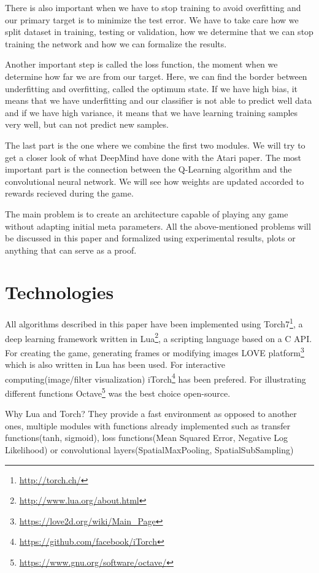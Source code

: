 There is also important when we have to stop training to avoid overfitting and our primary target is to minimize the test error. We have to take care how we split dataset in training, testing or validation, how we determine that we can stop training the network and how we can formalize the results.

Another important step is called the loss function, the moment when we determine how far we are from our target. Here, we can find the border between underfitting and overfitting, called the optimum state. If we have high bias, it means that we have underfitting and our classifier is not able to predict well data and if we have high variance, it means that we have learning training samples very well, but can not predict new samples.

The last part is the one where we combine the first two modules. We will try to get a closer look of what DeepMind have done with the Atari paper\cite{atari}. The most important part is the connection between the Q-Learning algorithm and the convolutional neural network. We will see how weights are updated accorded to rewards recieved during the game.

The main problem is to create an architecture capable of playing any game without adapting initial meta parameters. All the above-mentioned problems will be discussed in this paper and formalized using experimental results, plots or anything that can serve as a proof.
\newpage

\section{Technologies}
\label{sec:technologies}
All algorithms described in this paper have been implemented using Torch7\footnote{\url{http://torch.ch/}}, a deep learning framework written in Lua\footnote{\url{http://www.lua.org/about.html}}, a scripting language based on a C API. For creating the game, generating frames or modifying images LOVE platform\footnote{\url{https://love2d.org/wiki/Main_Page}} which is also written in Lua has been used. For interactive computing(image/filter visualization) iTorch\footnote{\url{https://github.com/facebook/iTorch}} has been prefered. For illustrating different functions Octave\footnote{\url{https://www.gnu.org/software/octave/}} was the best choice open-source.

Why Lua and Torch? They provide a fast environment as opposed to another ones\cite{torch7}, multiple modules with functions already implemented such as transfer functions(tanh, sigmoid), loss functions(Mean Squared Error, Negative Log Likelihood) or convolutional layers(SpatialMaxPooling, SpatialSubSampling)

